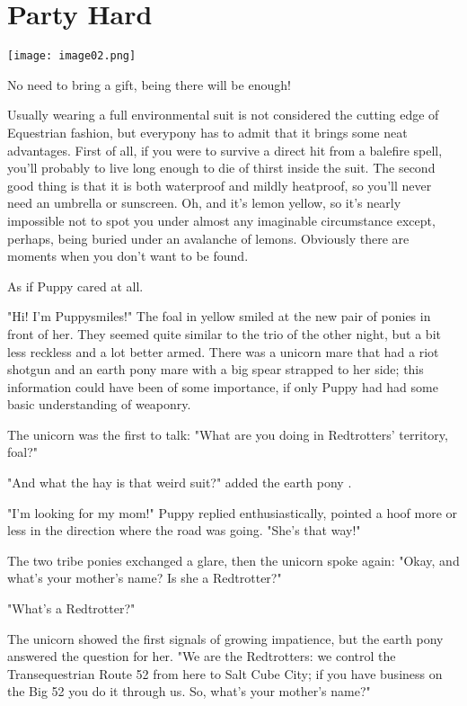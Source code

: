 \chapter{Party Hard}

\texttt{[image: image02.png]}

\begin{intro}
    No need to bring a gift, being there will be enough!
\end{intro}


Usually wearing a full environmental suit is not considered the cutting edge of Equestrian fashion, but everypony has to admit that it brings some neat advantages. First of all, if you were to survive a direct hit from a balefire spell, you'll probably to live long enough to die of thirst inside the suit. The second good thing is that it is both waterproof and mildly heatproof, so you'll never need an umbrella or sunscreen. Oh, and it's lemon yellow, so it's nearly impossible not to spot you under almost any imaginable circumstance except, perhaps, being buried under an avalanche of lemons. Obviously there are moments when you don't want to be found.

As if Puppy cared at all.

"Hi! I'm Puppysmiles!" The foal in yellow smiled at the new pair of ponies in front of her. They seemed quite similar to the trio of the other night, but a bit less reckless and a lot better armed. There was a unicorn mare that had a riot shotgun and an earth pony mare with a big spear strapped to her side; this information could have been of some importance, if only Puppy had had some basic understanding of weaponry.

The unicorn was the first to talk: "What are you doing in Redtrotters' territory, foal?"

"And what the hay is that weird suit?" added the earth pony .

"I'm looking for my mom!" Puppy replied enthusiastically, pointed a hoof more or less in the direction where the road was going. "She's that way!"

The two tribe ponies exchanged a glare, then the unicorn spoke again: "Okay, and what's your mother's name? Is she a Redtrotter?"

"What's a Redtrotter?"

The unicorn showed the first signals of growing impatience, but the earth pony answered the question for her. "We are the Redtrotters: we control the Transequestrian Route 52 from here to Salt Cube City; if you have business on the Big 52 you do it through us. So, what's your mother's name?"

